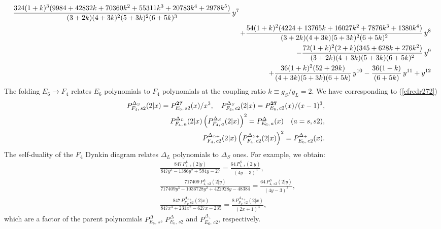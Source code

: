\documentclass[a4paper,12pt]{article}
\begin{document}
\begin{eqnarray}
      {324(1 + k)^3(9984 + 42832k + 70360k^2 + 55311k^3 + 20783k^4 +
          2978k^5)\over{(3 + 2k)(4 + 3k)^2(5 + 3k)^2(6 + 5k)^3}}\,y^7\nonumber\\
   &&\hspace{-5mm}\;\; +
      {54(1 + k)^2(4224 + 13765k + 16027k^2 + 7876k^3 + 1380k^4)\over
        {(3 + 2k)(4 + 3k)(5 + 3k)^2(6 + 5k)^2}}\,y^8 \nonumber\\
   &&\hspace{-5mm}\;\; -
       {72(1 + k)^2(2 + k)(345 + 628k + 276k^2)\over
        {(3 + 2k)(4 + 3k)(5 + 3k)(6 + 5k)^2}}\,y^9\nonumber\\
   &&\hspace{-5mm}\;\; +
      {36(1 + k)^2(52 + 29k)\over{(4 + 3k)(5 + 3k)(6 + 5k)}}\,y^{10} -
      {36(1 + k)\over{(6 + 5k)}}\,y^{11} + y^{12}
   \label{f4ts}
\end{eqnarray}
The folding $E_6\to F_4$ relates $E_6$ polynomials to $F_4$ polynomials at
the coupling ratio $k\equiv g_S/g_L=2$.
We have corresponding to (\ref{efredr272})
\begin{eqnarray}
   &&P_{F_4,\,s2}^{\Delta_S}(2|x)=P_{E_6,\,s2}^{\bf 27}(x)/x^3,\quad
   P_{F_4,\,c2}^{\Delta_S}(2|x)=P_{E_6,\,c2}^{\bf 27}(x)/(x-1)^3,
   \label{efredt272}\\
%
   &&P_{F_4,\,a}^{\Delta_L}(2|x)\left(P_{F_4,\,a}^{\Delta_S}(2|x)\right)^2=
   P_{E_6,\,a}^{\Delta}(x)\quad(a=s,s2),
   \label{efredt273}\\
%
   &&P_{F_4,\,c2}^{\Delta_{L+}}(2|x)
   \left(P_{F_4,\,c2}^{\Delta_{S+}}(2|x)\right)^2=
   P_{E_6,\,c2}^{\Delta_+}(x).
   \label{efredt274}
\end{eqnarray}
The self-duality of the $F_4$ Dynkin diagram relates $\Delta_L$ polynomials
to $\Delta_S$ ones. For example, we obtain:
\begin{eqnarray}
   &&\frac{847\,P_{4,\,s}^{L}(2|y)}{847y^3-1386y^2+594y-27}
   =\frac{64\,P_{4,\,s}^{S}(2|y)}{(4y-3)^3},
   \label{f4seld2}\\[5pt]
%
   &&\frac{717409\,P_{4,\,s2}^{L}(2|y)}
   {717409y^3-1036728y^2+422928y-48384}
   =\frac{64\,P_{4,\,s2}^{S}(2|y)}{(4y-3)^3},
   \label{f4seld1}\\[5pt]
%
   &&\frac{847\,P_{F_4,\,c2}^{\Delta_{L+}}(2|x)}{847x^3+231x^2-627x-235}
   =\frac{8\,P_{F_4,\,c2}^{\Delta_{S+}}(2|x)}{(2x+1)^3},
\end{eqnarray}
which are a factor of the parent polynomials $P_{E_6,\,s}^{\Delta}$, 
$P_{E_6,\,s2}^{\Delta}$ and $P_{E_6,\,c2}^{\Delta_+}$, respectively.
\end{document}
